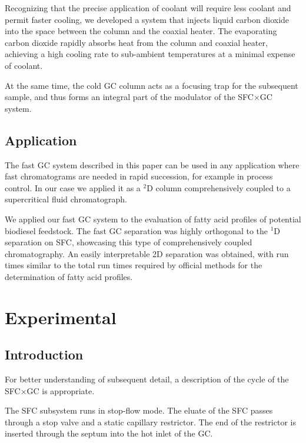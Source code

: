 \documentclass[aip,rsi,preprint,graphicx]{revtex4-1} %
\begin{document}
Recognizing that the precise application of coolant will require less coolant
and permit faster cooling, we developed a system that injects liquid carbon
dioxide into the space between the column and the coaxial heater. The
evaporating carbon dioxide rapidly absorbs heat from the column and coaxial
heater, achieving a high cooling rate to sub-ambient temperatures at a minimal
expense of coolant.

At the same time, the cold GC column acts as a focusing trap for the subsequent
sample, and thus forms an integral part of the modulator of the SFC×GC
system.

\subsection{Application}

The fast GC system described in this paper can be used in any application where
fast chromatograms are needed in rapid succession, for example in process
control. In our case we applied it as a $^2$D column comprehensively coupled to
a supercritical fluid chromatograph.

We applied our fast GC system to the evaluation of fatty acid profiles of
potential biodiesel feedstock. The fast GC separation was highly orthogonal to
the $^1$D separation on SFC, showcasing this type of comprehensively coupled
chromatography. An easily interpretable 2D separation was obtained, with run
times similar to the total run times required by official methods for the
determination of fatty acid profiles.

\section{Experimental}

\subsection{Introduction}

For better understanding of subsequent detail, a description of the cycle of the
SFC×GC is appropriate.

The SFC subsystem runs in stop-flow mode. The eluate of the SFC passes through a
stop valve and a static capillary restrictor. The end of the restrictor is 
inserted through the septum into the hot inlet of the GC.
\end{document}
